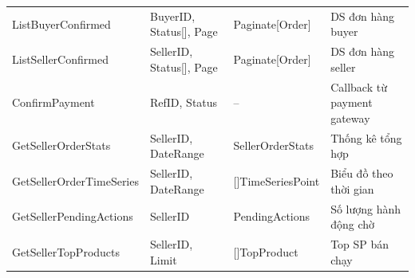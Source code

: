 \begin{longtable}{@{}L{3.2cm}L{4cm}L{2.8cm}L{4cm}@{}}
ListBuyerConfirmed & BuyerID, Status[], Page & Paginate[Order] & DS đơn hàng buyer \\
ListSellerConfirmed & SellerID, Status[], Page & Paginate[Order] & DS đơn hàng seller \\
ConfirmPayment   & RefID, Status & -- & Callback từ payment gateway \\
\addlinespace
GetSellerOrderStats & SellerID, DateRange & SellerOrderStats & Thống kê tổng hợp \\
GetSellerOrderTimeSeries & SellerID, DateRange & []TimeSeriesPoint & Biểu đồ theo thời gian \\
GetSellerPendingActions & SellerID & PendingActions & Số lượng hành động chờ \\
GetSellerTopProducts & SellerID, Limit & []TopProduct & Top SP bán chạy \\
\end{longtable}
\normalsize


